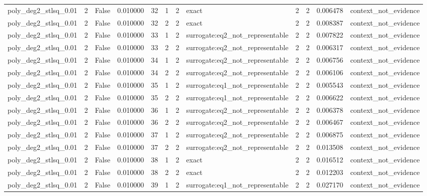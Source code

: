 \begin{tabular}{lrrrrrrlrrrl}
poly\_deg2\_stlsq\_0.01 & 2 & False & 0.010000 & 32 & 1 & 2 & exact & 2 & 2 & 0.006478 & context\_not\_evidence \\
poly\_deg2\_stlsq\_0.01 & 2 & False & 0.010000 & 32 & 2 & 2 & exact & 2 & 2 & 0.008387 & context\_not\_evidence \\
poly\_deg2\_stlsq\_0.01 & 2 & False & 0.010000 & 33 & 1 & 2 & surrogate:eq2\_not\_representable & 2 & 2 & 0.007822 & context\_not\_evidence \\
poly\_deg2\_stlsq\_0.01 & 2 & False & 0.010000 & 33 & 2 & 2 & surrogate:eq2\_not\_representable & 2 & 2 & 0.006317 & context\_not\_evidence \\
poly\_deg2\_stlsq\_0.01 & 2 & False & 0.010000 & 34 & 1 & 2 & surrogate:eq2\_not\_representable & 2 & 2 & 0.006756 & context\_not\_evidence \\
poly\_deg2\_stlsq\_0.01 & 2 & False & 0.010000 & 34 & 2 & 2 & surrogate:eq2\_not\_representable & 2 & 2 & 0.006106 & context\_not\_evidence \\
poly\_deg2\_stlsq\_0.01 & 2 & False & 0.010000 & 35 & 1 & 2 & surrogate:eq1\_not\_representable & 2 & 2 & 0.005543 & context\_not\_evidence \\
poly\_deg2\_stlsq\_0.01 & 2 & False & 0.010000 & 35 & 2 & 2 & surrogate:eq1\_not\_representable & 2 & 2 & 0.006622 & context\_not\_evidence \\
poly\_deg2\_stlsq\_0.01 & 2 & False & 0.010000 & 36 & 1 & 2 & surrogate:eq2\_not\_representable & 2 & 2 & 0.006378 & context\_not\_evidence \\
poly\_deg2\_stlsq\_0.01 & 2 & False & 0.010000 & 36 & 2 & 2 & surrogate:eq2\_not\_representable & 2 & 2 & 0.006467 & context\_not\_evidence \\
poly\_deg2\_stlsq\_0.01 & 2 & False & 0.010000 & 37 & 1 & 2 & surrogate:eq2\_not\_representable & 2 & 2 & 0.006875 & context\_not\_evidence \\
poly\_deg2\_stlsq\_0.01 & 2 & False & 0.010000 & 37 & 2 & 2 & surrogate:eq2\_not\_representable & 2 & 2 & 0.013508 & context\_not\_evidence \\
poly\_deg2\_stlsq\_0.01 & 2 & False & 0.010000 & 38 & 1 & 2 & exact & 2 & 2 & 0.016512 & context\_not\_evidence \\
poly\_deg2\_stlsq\_0.01 & 2 & False & 0.010000 & 38 & 2 & 2 & exact & 2 & 2 & 0.012203 & context\_not\_evidence \\
poly\_deg2\_stlsq\_0.01 & 2 & False & 0.010000 & 39 & 1 & 2 & surrogate:eq1\_not\_representable & 2 & 2 & 0.027170 & context\_not\_evidence \\

\end{tabular}
